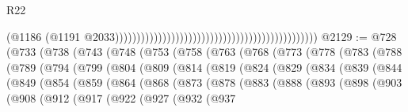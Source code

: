 \begin{lexlean}{R22}
\begin{coremodule}
                                                                                              (@1186
                                                                                                (@1191
                                                                                                  @2033)))))))))))))))))))))))))))))))))))))))))))))))
@2129 := @728
    (@733
      (@738
        (@743
          (@748
            (@753
              (@758
                (@763
                  (@768
                    (@773
                      (@778
                        (@783
                          (@788
                            (@789
                              (@794
                                (@799
                                  (@804
                                    (@809
                                      (@814
                                        (@819
                                          (@824
                                            (@829
                                              (@834
                                                (@839
                                                  (@844
                                                    (@849
                                                      (@854
                                                        (@859
                                                          (@864
                                                            (@868
                                                              (@873
                                                                (@878
                                                                  (@883
                                                                    (@888
                                                                      (@893
                                                                        (@898
                                                                          (@903
                                                                            (@908
                                                                              (@912
                                                                                (@917
                                                                                  (@922
                                                                                    (@927
                                                                                      (@932
                                                                                        (@937

\end{coremodule}
\end{lexlean}
